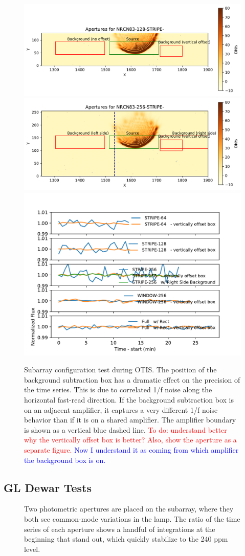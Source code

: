 \documentclass{aastex62}
\begin{document}
\begin{figure}[!hbtp]
\centering
\includegraphics[width=0.48\columnwidth]{apertures_for_NRCN83-128-STRIPE-72.pdf}
\includegraphics[width=0.48\columnwidth]{apertures_for_NRCN83-256-STRIPE-72.pdf}
\includegraphics[width=.48\columnwidth]{subarray_config_tser_backsub_rect.pdf}
\caption{Subarray configuration test during OTIS. The position of the background subtraction box has a dramatic effect on the precision of the time series.
This is due to correlated 1/f noise along the horizontal fast-read direction.
If the background subtraction box is on an adjacent amplifier, it captures a very different 1/f noise behavior than if it is on a shared amplifier.
The amplifier boundary is shown as a vertical blue dashed line.
\textcolor{red}{To do: understand better why the vertically offset box is better? Also, show the aperture as a separate figure.}
\textcolor{blue}{Now I understand it as coming from which amplifier the background box is on.}}\label{fig:OTISRectBacksub}
\end{figure}

\clearpage
\subsection{GL Dewar Tests}
\begin{figure}
\caption{Two photometric apertures are placed on the subarray, where they both see common-mode variations in the lamp.
The ratio of the time series of each aperture shows a handful of integrations at the beginning that stand out, which quickly stabilize to the 240 ppm level.
}\label{fig:GLtSeries}
\end{figure}
\end{document}
